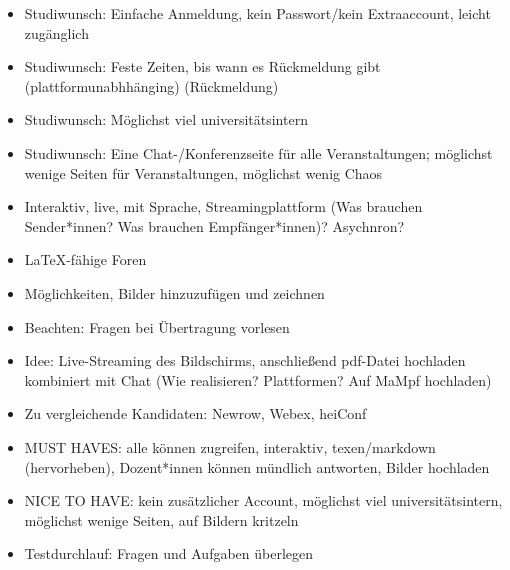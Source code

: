 \documentclass[parskip=off,index=totocnumbered]{scrreprt}
\begin{document}
   \begin{itemize}
      \item Studiwunsch: Einfache Anmeldung, kein Passwort/kein Extraaccount, leicht zugänglich
      \item Studiwunsch: Feste Zeiten, bis wann es Rückmeldung gibt (plattformunabhhänging) (Rückmeldung)
      \item Studiwunsch: Möglichst viel universitätsintern
      \item Studiwunsch: Eine Chat-/Konferenzseite für alle Veranstaltungen; möglichst wenige Seiten für Veranstaltungen, möglichst wenig Chaos
      \item Interaktiv, live, mit Sprache, Streamingplattform (Was brauchen Sender*innen? Was brauchen Empfänger*innen)? Asychnron?
      \item \LaTeX-fähige Foren
      \item Möglichkeiten, Bilder hinzuzufügen und zeichnen
      \item Beachten: Fragen bei Übertragung vorlesen
      \item Idee: Live-Streaming des Bildschirms, anschließend pdf-Datei hochladen kombiniert mit Chat (Wie realisieren? Plattformen? Auf MaMpf hochladen)
      \item Zu vergleichende Kandidaten: Newrow, Webex, heiConf
      \item MUST HAVES: alle können zugreifen, interaktiv, texen/markdown (hervorheben), Dozent*innen können mündlich antworten, Bilder hochladen
      \item NICE TO HAVE: kein zusätzlicher Account, möglichst viel universitätsintern, möglichst wenige Seiten, auf Bildern kritzeln
      \item Testdurchlauf: Fragen und Aufgaben überlegen
   \end{itemize}
\end{document}
